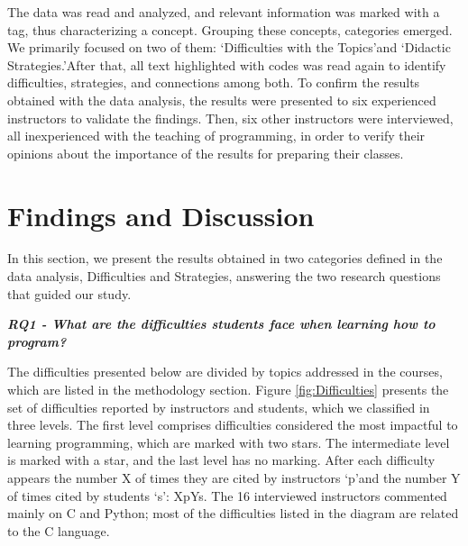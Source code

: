 \documentclass[sigconf]{acmart}
\begin{document}
The data was read and analyzed, and relevant information was marked with a tag, thus characterizing a concept. Grouping these concepts, categories emerged. We primarily focused on two of them: \textquoteleft Difficulties with the Topics\textquoteright \space and \textquoteleft Didactic Strategies.\textquoteright \space After that, all text highlighted with codes was read again to identify difficulties, strategies, and connections among both. To confirm the results obtained with the data analysis, the results were presented to six experienced instructors to validate the findings. Then, six other instructors were interviewed, all inexperienced with the teaching of programming, in order to verify their opinions about the importance of the results for preparing their classes.

\section{Findings and Discussion}
In this section, we present the results obtained in two categories defined in the data analysis, Difficulties and Strategies, answering the two research questions that guided our study.

\textbf {\textit{RQ1 - What are the difficulties students face when learning how to program?}}

The difficulties presented below are divided by topics addressed in the courses, which are listed in the methodology section. Figure \ref{fig:Difficulties} presents the set of difficulties reported by instructors and students, which we classified in three levels. The first level comprises difficulties considered the most impactful to learning programming, which are marked with two stars. The intermediate level is marked with a star, and the last level has no marking. After each difficulty appears the number X of times they are cited by instructors \textquoteleft p\textquoteright \space and the number Y of times cited by students \textquoteleft s\textquoteright: XpYs. The 16 interviewed instructors commented mainly on C and Python; most of the difficulties listed in the diagram are related to the C language.
\end{document}
